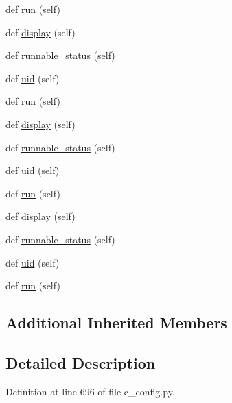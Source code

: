 \begin{DoxyCompactItemize}
def \hyperlink{classwaflib_1_1_tools_1_1c__config_1_1cfgtask_a5621ce914bfed0045cc99f93cf7381af}{run} (self)
\item 
def \hyperlink{classwaflib_1_1_tools_1_1c__config_1_1cfgtask_aecf986e3bdcfc517a0cd9e4b776d8366}{display} (self)
\item 
def \hyperlink{classwaflib_1_1_tools_1_1c__config_1_1cfgtask_af809af735ae4d53f098dff58980dff43}{runnable\+\_\+status} (self)
\item 
def \hyperlink{classwaflib_1_1_tools_1_1c__config_1_1cfgtask_a97e3028401d435571c7ea130eaff5162}{uid} (self)
\item 
def \hyperlink{classwaflib_1_1_tools_1_1c__config_1_1cfgtask_a5621ce914bfed0045cc99f93cf7381af}{run} (self)
\item 
def \hyperlink{classwaflib_1_1_tools_1_1c__config_1_1cfgtask_aecf986e3bdcfc517a0cd9e4b776d8366}{display} (self)
\item 
def \hyperlink{classwaflib_1_1_tools_1_1c__config_1_1cfgtask_af809af735ae4d53f098dff58980dff43}{runnable\+\_\+status} (self)
\item 
def \hyperlink{classwaflib_1_1_tools_1_1c__config_1_1cfgtask_a97e3028401d435571c7ea130eaff5162}{uid} (self)
\item 
def \hyperlink{classwaflib_1_1_tools_1_1c__config_1_1cfgtask_a5621ce914bfed0045cc99f93cf7381af}{run} (self)
\item 
def \hyperlink{classwaflib_1_1_tools_1_1c__config_1_1cfgtask_aecf986e3bdcfc517a0cd9e4b776d8366}{display} (self)
\item 
def \hyperlink{classwaflib_1_1_tools_1_1c__config_1_1cfgtask_af809af735ae4d53f098dff58980dff43}{runnable\+\_\+status} (self)
\item 
def \hyperlink{classwaflib_1_1_tools_1_1c__config_1_1cfgtask_a97e3028401d435571c7ea130eaff5162}{uid} (self)
\item 
def \hyperlink{classwaflib_1_1_tools_1_1c__config_1_1cfgtask_a5621ce914bfed0045cc99f93cf7381af}{run} (self)
\end{DoxyCompactItemize}
\subsection*{Additional Inherited Members}


\subsection{Detailed Description}


Definition at line 696 of file c\+\_\+config.\+py.



